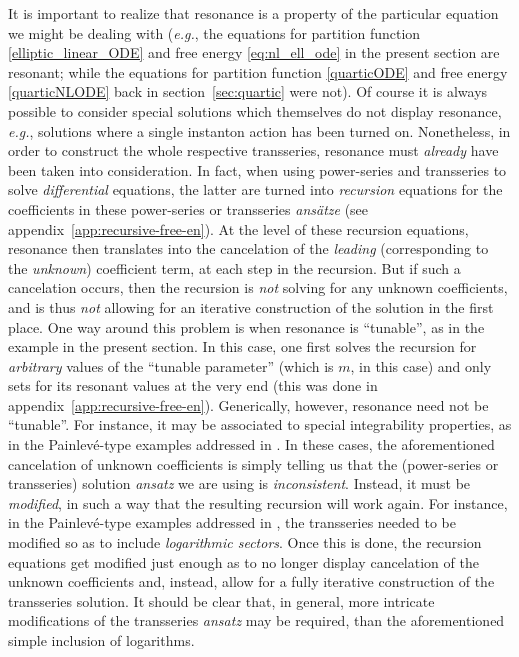 \documentclass[11pt,a4paper]{article}
\begin{document}
It is important to realize that resonance is a property of the particular equation we might be dealing with (\textit{e.g.}, the equations for partition function \eqref{elliptic_linear_ODE} and free energy \eqref{eq:nl_ell_ode} in the present section are resonant; while the equations for partition function \eqref{quarticODE} and free energy \eqref{quarticNLODE} back in section~\ref{sec:quartic} were not). Of course it is always possible to consider special solutions which themselves do not display resonance, \textit{e.g.}, solutions where a single instanton action has been turned on. Nonetheless, in order to construct the whole respective transseries, resonance must \textit{already} have been taken into consideration. In fact, when using power-series and transseries to solve \textit{differential} equations, the latter are turned into \textit{recursion} equations for the coefficients in these power-series or transseries \textit{ans\"atze} (see appendix~\ref{app:recursive-free-en}). At the level of these recursion equations, resonance then translates into the cancelation of the \textit{leading} (corresponding to the \textit{unknown}) coefficient term, at each step in the recursion. But if such a cancelation occurs, then the recursion is \textit{not} solving for any unknown coefficients, and is thus \textit{not} allowing for an iterative construction of the solution in the first place. One way around this problem is when resonance is ``tunable'', as in the example in the present section. In this case, one first solves the recursion for \textit{arbitrary} values of the ``tunable parameter'' (which is $m$, in this case) and only sets for its resonant values at the very end (this was done in appendix~\ref{app:recursive-free-en}). Generically, however, resonance need not be ``tunable''. For instance, it may be associated to special integrability properties, as in the Painlev\'e-type examples addressed in \cite{gikm10, asv11, sv13}. In these cases, the aforementioned cancelation of unknown coefficients is simply telling us that the (power-series or transseries) solution \textit{ansatz} we are using is \textit{inconsistent}. Instead, it must be \textit{modified}, in such a way that the resulting recursion will work again. For instance, in the Painlev\'e-type examples addressed in \cite{gikm10, asv11, sv13}, the transseries needed to be modified so as to include \textit{logarithmic sectors}. Once this is done, the recursion equations get modified just enough as to no longer display cancelation of the unknown coefficients and, instead, allow for a fully iterative construction of the transseries solution. It should be clear that, in general, more intricate modifications of the transseries \textit{ansatz} may be required, than the aforementioned simple inclusion of logarithms.
\end{document}
